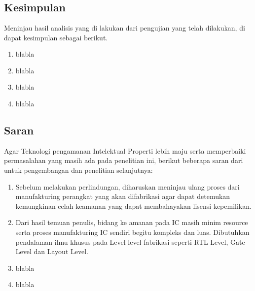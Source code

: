 \chapter{\kesimpulan}

\section{Kesimpulan}
Meninjau hasil analisis yang di lakukan dari pengujian yang telah dilakukan, di dapat kesimpulan sebagai berikut.

\begin{enumerate}	
	\item blabla
	
	\item blabla
	
	\item blabla
	
	\item blabla
\end{enumerate}

\section{Saran}
Agar Teknologi pengamanan Intelektual Properti lebih maju serta memperbaiki permasalahan yang masih ada pada penelitian ini, berikut beberapa saran dari untuk pengembangan dan penelitian selanjutnya:

\begin{enumerate}	
	\item Sebelum melakukan perlindungan, diharuskan meninjau ulang proses dari manufakturing perangkat yang akan difabrikasi agar dapat detemukan kemungkinan celah keamanan yang dapat membahayakan lisensi kepemilikan.
	
	\item Dari hasil temuan penulis, bidang ke amanan pada IC masih minim resource serta proses manufakturing IC sendiri begitu kompleks dan luas. Dibutuhkan pendalaman ilmu khusus pada Level level fabrikasi seperti RTL Level, Gate Level dan Layout Level.
	
	\item blabla
	
	\item blabla
\end{enumerate}